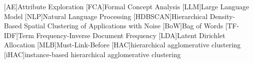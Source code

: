\begin{acronym}
    [AE]{Attribute Exploration}
    [FCA]{Formal Concept Analysis}
    [LLM]{Large Language Model}
    [NLP]{Natural Language Processing}
    [HDBSCAN]{Hierarchical Density-Based Spatial Clustering of Applications with Noise}
    [BoW]{Bag of Words}
    [TF-IDF]{Term Frequency-Inverse Document Frequency}
    [LDA]{Latent Dirichlet Allocation}
    [MLB]{Must-Link-Before}
    [HAC]{hierarchical agglomerative clustering}
    [iHAC]{instance-based hierarchical agglomerative clustering}
\end{acronym}